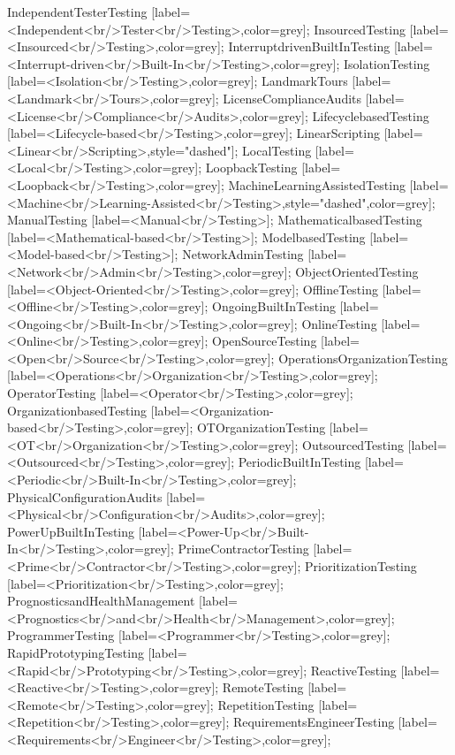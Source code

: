 \documentclass{article}
\begin{document}
{IndependentTesterTesting [label=<Independent<br/>Tester<br/>Testing>,color=grey];
InsourcedTesting [label=<Insourced<br/>Testing>,color=grey];
InterruptdrivenBuiltInTesting [label=<Interrupt-driven<br/>Built-In<br/>Testing>,color=grey];
IsolationTesting [label=<Isolation<br/>Testing>,color=grey];
LandmarkTours [label=<Landmark<br/>Tours>,color=grey];
LicenseComplianceAudits [label=<License<br/>Compliance<br/>Audits>,color=grey];
LifecyclebasedTesting [label=<Lifecycle-based<br/>Testing>,color=grey];
LinearScripting [label=<Linear<br/>Scripting>,style="dashed"];
LocalTesting [label=<Local<br/>Testing>,color=grey];
LoopbackTesting [label=<Loopback<br/>Testing>,color=grey];
MachineLearningAssistedTesting [label=<Machine<br/>Learning-Assisted<br/>Testing>,style="dashed",color=grey];
ManualTesting [label=<Manual<br/>Testing>];
MathematicalbasedTesting [label=<Mathematical-based<br/>Testing>];
ModelbasedTesting [label=<Model-based<br/>Testing>];
NetworkAdminTesting [label=<Network<br/>Admin<br/>Testing>,color=grey];
ObjectOrientedTesting [label=<Object-Oriented<br/>Testing>,color=grey];
OfflineTesting [label=<Offline<br/>Testing>,color=grey];
OngoingBuiltInTesting [label=<Ongoing<br/>Built-In<br/>Testing>,color=grey];
OnlineTesting [label=<Online<br/>Testing>,color=grey];
OpenSourceTesting [label=<Open<br/>Source<br/>Testing>,color=grey];
OperationsOrganizationTesting [label=<Operations<br/>Organization<br/>Testing>,color=grey];
OperatorTesting [label=<Operator<br/>Testing>,color=grey];
OrganizationbasedTesting [label=<Organization-based<br/>Testing>,color=grey];
OTOrganizationTesting [label=<OT<br/>Organization<br/>Testing>,color=grey];
OutsourcedTesting [label=<Outsourced<br/>Testing>,color=grey];
PeriodicBuiltInTesting [label=<Periodic<br/>Built-In<br/>Testing>,color=grey];
PhysicalConfigurationAudits [label=<Physical<br/>Configuration<br/>Audits>,color=grey];
PowerUpBuiltInTesting [label=<Power-Up<br/>Built-In<br/>Testing>,color=grey];
PrimeContractorTesting [label=<Prime<br/>Contractor<br/>Testing>,color=grey];
PrioritizationTesting [label=<Prioritization<br/>Testing>,color=grey];
PrognosticsandHealthManagement [label=<Prognostics<br/>and<br/>Health<br/>Management>,color=grey];
ProgrammerTesting [label=<Programmer<br/>Testing>,color=grey];
RapidPrototypingTesting [label=<Rapid<br/>Prototyping<br/>Testing>,color=grey];
ReactiveTesting [label=<Reactive<br/>Testing>,color=grey];
RemoteTesting [label=<Remote<br/>Testing>,color=grey];
RepetitionTesting [label=<Repetition<br/>Testing>,color=grey];
RequirementsEngineerTesting [label=<Requirements<br/>Engineer<br/>Testing>,color=grey];
}
\end{document}
